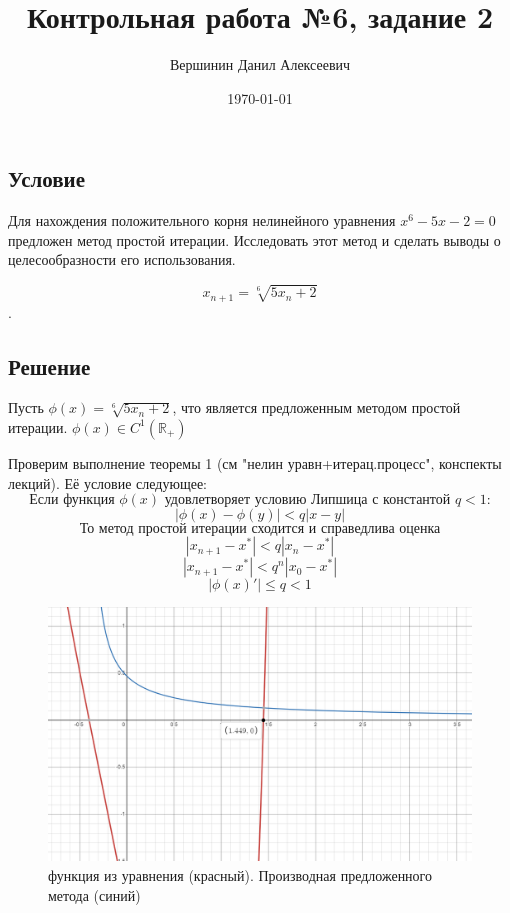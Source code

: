 \documentclass{article}
\title{\vspace{-1cm}Контрольная работа №6, задание 2}
\author{Вершинин Данил Алексеевич}
\date{\today}
\begin{document}
	\maketitle
	\subsection{Условие}
	Для нахождения положительного корня нелинейного уравнения $x^6-5x-2=0$ предложен метод простой итерации. Исследовать этот метод и сделать выводы о целесообразности его использования.
	
	$$x_{n+1} = \sqrt[6]{5x_n+2}$$.
	\subsection{Решение}
	Пусть $\phi (x) = \sqrt[6]{5x_n+2}$, что является предложенным методом простой итерации. $\phi(x)\in C^1(\mathbb{R_+})$\newline
	\begin{mdframed}
		Проверим выполнение теоремы 1 (см "нелин уравн+итерац.процесс", конспекты лекций). Её условие следующее:
		\[\text{Если функция $\phi(x)$ удовлетворяет условию Липшица с константой $q<1$:}\]
		\[|\phi(x) - \phi(y)|<q|x-y|\]
		\[\text{То метод простой итерации сходится и справедлива оценка}\]
		\[|x_{n+1} - x^*| < q|x_n-x^*|\]
		\[|x_{n+1} - x^*| < q^n|x_0-x^*|\]
		\[|\phi(x)'| \le q < 1\]
	\end{mdframed}
	\begin{figure}[h]
		\centering
		\includegraphics[width=150mm,scale=0.6]{iterations2_1.png}
		\caption{функция из уравнения (красный). Производная предложенного метода (синий)}
	\end{figure}
	
\end{document}
